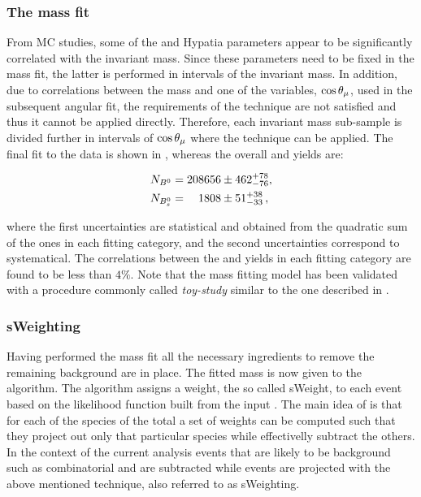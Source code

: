 \subsubsection{The mass fit}
From MC studies, some of the \Bs and \Bd Hypatia parameters appear to be significantly correlated with the \mkpi invariant mass.
Since these parameters need to be fixed in the mass fit, the latter is performed in intervals of the
\mkpi invariant mass. In addition, due to correlations between the mass and one of the variables, $\cos\theta_{\mu}$, used in the
subsequent angular fit, the requirements of the \sPlot technique are not satisfied and thus it cannot be applied directly.
Therefore, each \mkpi invariant mass sub-sample is divided further in intervals of $\cos\theta_{\mu}$ where the \sPlot technique
can be applied.  The final fit to the data is shown in , whereas the overall \Bs and \Bd yields are:

\begin{align}
  \centering
  N_{\Bd} &= 208656  \pm  462 ^{+ 78	}_{- 76}, \\
  N_{\Bs} &= \phantom{00}1808  \pm   51 ^{+ 38	}_{- 33} \, ,
  \label{signal_yields}
\end{align}

\noindent where the first uncertainties are statistical and obtained from the quadratic sum of the ones in each fitting category,
and the second uncertainties correspond to systematical. The correlations between the \Bd and \Bs yields in each fitting category
are found to be less than $4\%$. Note that the mass fitting model has been validated with a procedure commonly called {\it toy-study}
similar to the one described in .

\subsubsection{sWeighting}
Having performed the mass fit all the necessary ingredients to remove the remaining background are in place.
The fitted mass \pdf is now given to the \sPlot algorithm. The algorithm assigns a weight, the so called sWeight, to each event
based on the likelihood function built from the input \pdf. The main idea of \sPlot is that for each of the species of the total
\pdf a set of weights can be computed such that they project out only that particular species while effectivelly subtract the others.
In the context of the current analysis events that are likely to be background such as combinatorial and \LbJpsipK are
subtracted while \BJpsiKst events are projected with the above mentioned technique, also referred to as sWeighting.

